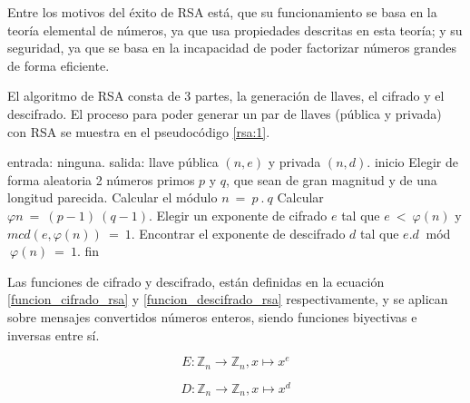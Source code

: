   Entre los motivos del éxito de RSA está, que su funcionamiento se basa en la 
  teoría elemental de números, ya que usa propiedades descritas en esta teoría; 
  y su seguridad, ya que se basa en la incapacidad de poder factorizar números 
  grandes de forma eficiente.

  El algoritmo de RSA consta de 3 partes, la generación de llaves, el cifrado 
  y el descifrado. El proceso para poder generar un par de llaves (pública y 
  privada) con RSA se muestra en el pseudocódigo \ref{rsa:1}. 

  \begin{pseudocodigo}[caption={Proceso de generación de llaves de RSA.}, 
  label={rsa:1}]
    entrada: ninguna.
    salida:  llave pública $(n,e)$ y privada $(n,d)$.
    inicio
      Elegir de forma aleatoria 2 números primos $p$ y $q$, que sean de gran 
      magnitud y de una longitud parecida.
      Calcular el módulo $n\: =\: p \:. \:q$
      Calcular $\varphi{n} \:= \:(p-1) \:(q-1)$.
      Elegir un exponente de cifrado $e$ tal que $e \:< \:\varphi(n)$ y $mcd(e,\varphi(n)) \:= \:1$.
      Encontrar el exponente de descifrado $d$ tal que $e . d \:$ mód $ \:\varphi(n) \:= \:1$.
    fin
  \end{pseudocodigo}

  Las funciones de cifrado y descifrado, están definidas en la ecuación 
  \ref{funcion_cifrado_rsa} y \ref{funcion_descifrado_rsa} respectivamente, 
  y se aplican sobre mensajes convertidos números enteros, siendo funciones 
  biyectivas e inversas entre sí.

  \begin{equation}
    \label{funcion_cifrado_rsa}
    E: \mathbb{Z}_n \longrightarrow \mathbb{Z}_n, x \longmapsto x^e 
  \end{equation}

  \begin{equation}
    \label{funcion_descifrado_rsa}
    D: \mathbb{Z}_n \longrightarrow \mathbb{Z}_n, x \longmapsto x^d 
  \end{equation}

  